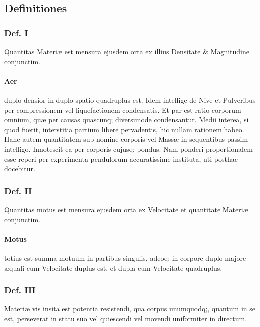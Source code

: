 \documentclass{ansarticle}
\begin{document}
\subsection{Definitiones}

\subsubsection{Def. I}
Quantitas Materi\ae{} est mensura ejusdem orta ex illius Densitate \&
Magnitudine conjunctim.

\paragraph{Aer}  duplo densior in duplo spatio quadruplus est. Idem
intellige de Nive et Pulveribus per compressionem vel liquefactionem
condensatis. Et par est ratio corporum omnium, qu\ae{} per causas
quascunq; diversimode condensantur. Medii interea, si quod fuerit,
interstitia partium libere pervadentis, hic nullam rationem
habeo. Hanc autem quantitatem sub nomine corporis vel Mass\ae{} in
sequentibus passim intelligo. Innotescit ea per corporis cujusq;
pondus. Nam ponderi proportionalem esse reperi per experimenta
pendulorum accuratissime instituta, uti posthac docebitur.

\subsubsection{Def. II}
Quantitas motus est mensura ejusdem orta ex Velocitate et quantitate
Materi\ae{} conjunctim.

\paragraph{Motus}
totius est summa motuum in partibus singulis, adeoq; in corpore duplo
majore \ae{}quali cum Velocitate duplus est, et dupla cum Velocitate
quadruplus.

\subsubsection{Def. III}
Materi\ae{} vis insita est potentia resistendi, qua corpus unumquodq;,
quantum in se est, perseverat in statu suo vel quiescendi vel movendi
uniformiter in directum.
\end{document}
